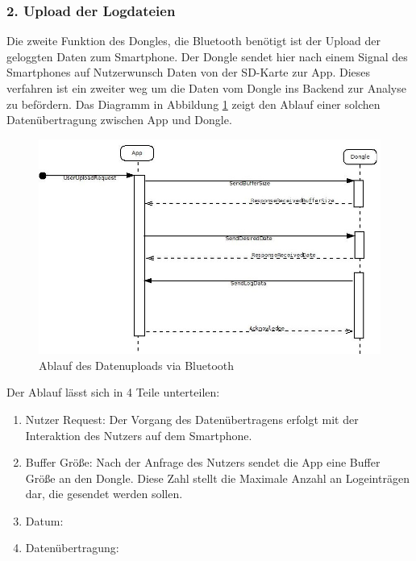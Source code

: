 \subsubsection*{2. Upload der Logdateien}
Die zweite Funktion des Dongles, die Bluetooth benötigt ist der Upload der geloggten Daten zum Smartphone. Der Dongle sendet hier nach einem Signal des Smartphones auf Nutzerwunsch Daten von der SD-Karte zur App. Dieses verfahren ist ein zweiter weg um die Daten vom Dongle ins Backend zur Analyse zu befördern. Das Diagramm in Abbildung \ref{fig:DataUpload} zeigt den Ablauf einer solchen Datenübertragung zwischen App und Dongle. 
\begin{figure}[h]
  \begin{center}
    \includegraphics[scale=0.6]{./img/DataUploadSequence.jpg}
    \caption{Ablauf des Datenuploads via Bluetooth}
    \label{fig:DataUpload}
  \end{center}
\end{figure}

Der Ablauf lässt sich in 4 Teile unterteilen:
\begin{enumerate}
  \item Nutzer Request: Der Vorgang des Datenübertragens erfolgt mit der Interaktion des Nutzers auf dem Smartphone. 
  \item Buffer Größe: Nach der Anfrage des Nutzers sendet die App eine Buffer Größe an den Dongle. Diese Zahl stellt die Maximale Anzahl an Logeinträgen dar, die gesendet werden sollen.
  \item  Datum:
  \item Datenübertragung:
\end{enumerate}
